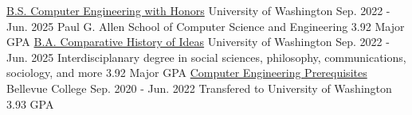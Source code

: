 \vspace{\sectionpadding}
\entry
    {\href{https://www.cs.washington.edu/academics/ugrad}{B.S. Computer Engineering with Honors}}
    {University of Washington}
    {Sep. 2022 - Jun. 2025}
    {
        Paul G. Allen School of Computer Science and Engineering \hfill \color{gray} 3.92 Major GPA \hspace{-0.62em}
    }
\vspace{-0.5ex}
\entry 
    {\href{https://chid.washington.edu/undergraduate-programs}{B.A. Comparative History of Ideas}}
    {University of Washington}
    {Sep. 2022 - Jun. 2025}
    {
        Interdisciplanary degree in social sciences, philosophy, communications, sociology, and more \hfill \color{gray} 3.92 Major GPA \hspace{-0.62em}
    }
\vspace{-0.5ex}
\entry 
    {\href{https://www.bellevuecollege.edu/}{Computer Engineering Prerequisites}}
    {Bellevue College}
    {Sep. 2020 - Jun. 2022}
    {
        Transfered to University of Washington \hfill \color{gray} 3.93 GPA \hspace{-0.62em}
    }